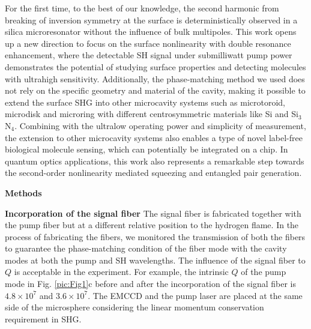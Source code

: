 \documentclass[a4paper,8pt,hyperref, twocolumn]{article}
\begin{document}
For the first time, to the best of our knowledge, the second harmonic from breaking of inversion symmetry at the surface  is deterministically observed in a silica microresonator without the influence of bulk multipoles. 
This work opens up a new direction to focus on the surface nonlinearity with double resonance enhancement, where the detectable SH signal under submilliwatt pump power demonstrates the potential of studying surface properties and detecting molecules with ultrahigh sensitivity. 
Additionally, the phase-matching method we used does not rely on the specific geometry and material of the cavity, making it possible to extend the surface SHG into other microcavity systems such as microtoroid, microdisk and microring with different centrosymmetric materials like Si and Si$_3$N$_4$.
Combining with the ultralow operating power and simplicity of measurement, the extension to other microcavity systems also enables a type of novel label-free biological molecule sensing, which can potentially be integrated on a chip. 
In quantum optics applications, this work also represents a remarkable step towards the second-order nonlinearity mediated squeezing and entangled pair generation.
 
\bigskip
\textbf{\large Methods}

\textbf{Incorporation of the signal fiber}
The signal fiber is fabricated together with the pump fiber but at a different relative position to the hydrogen flame. 
In the process of fabricating the fibers, we monitored the transmission of both the fibers to guarantee the phase-matching condition of the fiber mode with the cavity modes at both the pump and SH wavelengths.
The influence of the signal fiber to $Q$ is acceptable in the experiment.
For example, the intrinsic $Q$ of the pump mode in Fig. \ref{pic:Fig1}c before and after the incorporation of the signal fiber is $4.8\times10^7$ and $3.6\times10^7$.
The EMCCD and the pump laser are placed at the same side of the microsphere considering the linear momentum conservation requirement in SHG.
\end{document}
